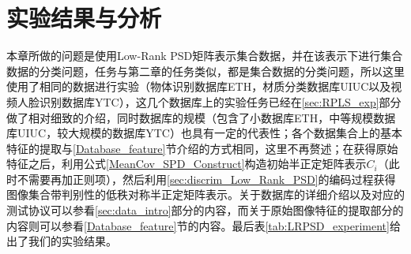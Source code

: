 \section{实验结果与分析}
本章所做的问题是使用Low-Rank PSD矩阵表示集合数据，并在该表示下进行集合数据的分类问题，任务与第二章的任务类似，都是集合数据的分类问题，所以这里使用了相同的数据进行实验（物体识别数据库ETH\cite{Database_ETH80}，材质分类数据库UIUC\cite{Database_UIUC}以及视频人脸识别数据库YTC\cite{Database_YTC}），这几个数据库上的实验任务已经在\ref{sec:RPLS_exp}部分做了相对细致的介绍，同时数据库的规模（包含了小数据库ETH，中等规模数据库UIUC，较大规模的数据库YTC）也具有一定的代表性；各个数据集合上的基本特征的提取与\ref{Database_feature}节介绍的方式相同，这里不再赘述；在获得原始特征之后，利用公式\ref{MeanCov_SPD_Construct}构造初始半正定矩阵表示$C_{i}$（此时不需要再加正则项），然后利用\ref{sec:discrim_Low_Rank_PSD}的编码过程获得图像集合带判别性的低秩对称半正定矩阵表示。关于数据库的详细介绍以及对应的测试协议可以参看\ref{sec:data_intro}部分的内容，而关于原始图像特征的提取部分的内容则可以参看\ref{Database_feature}节的内容。最后表\ref{tab:LRPSD_experiment}给出了我们的实验结果。

